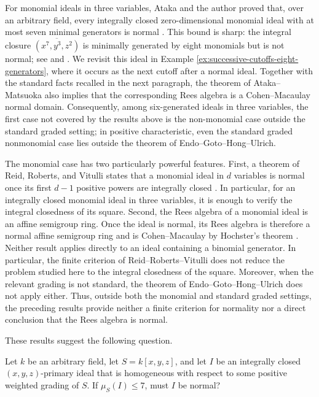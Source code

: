 For monomial ideals in three variables, Ataka and the author
\cite{AtakaMatsuoka2026} proved that, over an arbitrary field, every
integrally closed zero-dimensional monomial ideal with at most seven minimal
generators is normal \cite[Theorem~3.1]{AtakaMatsuoka2026}.  
This bound is sharp: the integral closure \(\overline{(x^7,y^3,z^2)}\) is 
minimally generated by eight monomials but is not normal; 
see \cite[Exercise 1.14]{SwansonHuneke2006} and \cite[Example 4.5]{AtakaMatsuoka2026}. 
We revisit this ideal in Example \ref{ex:successive-cutoffs-eight-generators}, where it occurs as the next cutoff after a normal ideal.
Together with the standard facts recalled in the next paragraph, the theorem of
Ataka--Matsuoka also implies that the corresponding Rees algebra is a
Cohen--Macaulay normal domain.  Consequently, among six-generated ideals in
three variables, the first case not covered by the results above is the
non-monomial case outside the standard graded setting; in positive characteristic, even the
standard graded nonmonomial case lies outside the theorem of
Endo--Goto--Hong--Ulrich.

The monomial case has two particularly powerful features.  First, a theorem
of Reid, Roberts, and Vitulli states that a monomial ideal in $d$ variables is
normal once its first $d-1$ positive powers are integrally closed
\cite[Proposition~3.1]{ReidRobertsVitulli2003}.  In particular, for an
integrally closed monomial ideal in three variables, it is enough to verify
the integral closedness of its square.  Second, the Rees algebra of a monomial
ideal is an affine semigroup ring.  Once the ideal is normal, its Rees algebra
is therefore a normal affine semigroup ring and is Cohen--Macaulay by
Hochster's theorem \cite{Hochster1972}.  Neither result applies directly to an
ideal containing a binomial generator.  In particular, the finite criterion
of Reid--Roberts--Vitulli does not reduce the problem studied here to the
integral closedness of the square.  Moreover, when the relevant grading is not
standard, the theorem of Endo--Goto--Hong--Ulrich does not apply either.  Thus,
outside both the monomial and standard graded settings, the preceding results
provide neither a finite criterion for normality nor a direct conclusion that
the Rees algebra is normal.

These results suggest the following question.

\begin{question}\label{que:seven-generators}
Let $k$ be an arbitrary field, let $S=k[x,y,z]$, and let $I$ be an integrally
closed $(x,y,z)$-primary ideal that is homogeneous with respect to some
positive weighted grading of $S$.  If $\mu_S(I)\leq7$, must $I$ be normal?
\end{question}

